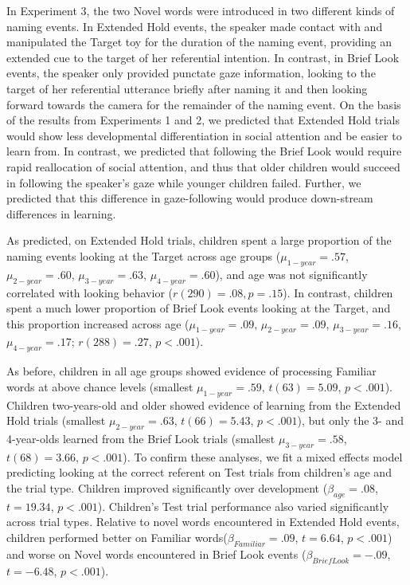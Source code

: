 \documentclass{pnastwo}
\begin{document}
\begin{article}
In Experiment 3, the two Novel words were introduced in two different kinds of naming events. In Extended Hold events, the speaker made contact with and manipulated the Target toy for the duration of the naming event, providing an extended cue to the target of her referential intention. In contrast, in Brief Look events, the speaker only provided punctate gaze information, looking to the target of her referential utterance briefly after naming it and then looking forward towards the camera for the remainder of the naming event. On the basis of the results from Experiments 1 and 2, we predicted that Extended Hold trials would show less developmental differentiation in social attention and be easier to learn from. In contrast, we predicted that following the Brief Look would require rapid reallocation of social attention, and thus that older children would succeed in following the speaker's gaze while younger children failed. Further, we predicted that this difference in gaze-following would produce down-stream differences in learning.

As predicted, on Extended Hold trials, children spent a large proportion of the naming events looking at the Target across age groups ($\mu_{1-year} = .57$, $\mu_{2-year} = .60$, $\mu_{3-year} = .63$, $\mu_{4-year} = .60$), and age was not significantly correlated with looking behavior ($r(290) = .08, p = .15$). In contrast, children spent a much lower proportion of Brief Look events looking at the Target, and this proportion increased across age ($\mu_{1-year} = .09$, $\mu_{2-year} = .09$, $\mu_{3-year} = .16$, $\mu_{4-year} = .17$; $r(288) = .27$, $p  < .001$).

As before, children in all age groups showed evidence of processing Familiar words at above chance levels (smallest $\mu_{1-year} = .59$, $t(63) = 5.09$, $p < .001$). Children two-years-old and older showed evidence of learning from the Extended Hold trials (smallest $\mu_{2-year} = .63$, $t(66) = 5.43$, $p < .001$), but only the 3- and 4-year-olds learned from the Brief Look trials (smallest $\mu_{3-year} = .58$, $t(68) = 3.66$, $p < .001$). To confirm these analyses, we fit a mixed effects model predicting looking at the correct referent on Test trials from children's age and the trial type. Children improved significantly over development ($\beta_{age} = .08$, $t = 19.34$, $p < . 001$). Children's Test trial performance also varied significantly across trial types. Relative to novel words encountered in Extended Hold events, children performed better on Familiar words($\beta_{Familiar} = .09$, $t = 6.64$, $p < . 001$) and worse on Novel words encountered in Brief Look events ($\beta_{Brief Look} = -.09$, $t = -6.48$, $p < . 001$).


\end{article}
\end{document}

